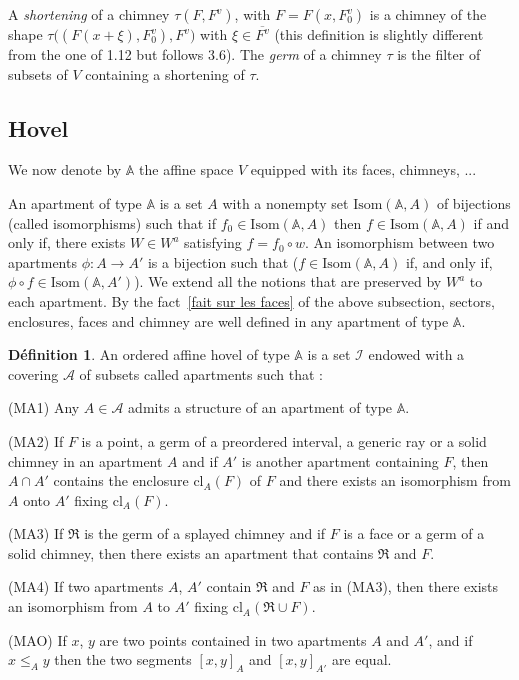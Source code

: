 \documentclass[12pt]{article}
\theoremstyle{plain}
\theoremstyle{definition}
\newtheorem{defn}[thm]{Définition}
\newcommand{\A}{\mathbb{A}}
\begin{document}
A \textit{shortening} of a chimney $\tau(F,F^v)$, with $F=F(x,F_0^v)$ is a chimney of the shape $\tau \big((F(x+\xi),F_0^v),F^v\big)$ with $\xi\in \overline{F^v}$ (this definition is slightly different from the one of \cite{rousseau2011masures} 1.12 but follows \cite{rousseau2012almost} 3.6). The \textit{germ} of a chimney $\tau$ is the filter of subsets of $V$ containing a shortening of $\tau$.




\subsection{Hovel}
We now denote by $\A$ the affine space $V$ equipped with its faces, chimneys, ...


An apartment of type $\A$ is a set $A$ with a nonempty set $\mathrm{Isom}(\A,A)$ of bijections (called isomorphisms) such that if $f_0\in \mathrm{Isom}(\A,A)$ then $f\in \mathrm{Isom}(\A,A)$ if and only if, there exists $W\in W^a$ satisfying $f=f_0\circ w$. An isomorphism between two apartments $\phi:A\rightarrow A'$ is a bijection such that ($f\in \mathrm{Isom}(\mathbb{A},A)$ if, and only if, $\phi \circ f\in \mathrm{Isom}(\A,A')$). We extend all the notions that are preserved by $W^a$ to each apartment. By the fact~\ref{fait sur les faces} of the above subsection, sectors, enclosures, faces and chimney are well defined in any apartment of type $\A$.

\begin{defn}
An ordered affine hovel of type $\A$ is a set $\mathcal{I}$ endowed with a covering $\mathcal{A}$ of subsets called apartments such that : 

(MA1) Any $A\in \mathcal{A}$ admits a structure of an apartment of type $\A$.

(MA2) If $F$ is a point, a germ of a preordered interval, a generic ray or a solid chimney in an apartment $A$ and if $A'$ is another apartment containing $F$, then $A\cap A'$ contains the enclosure $\mathrm{cl}_A(F)$ of $F$ and there exists an isomorphism from $A$ onto $A'$ fixing $\mathrm{cl}_A(F)$.

(MA3) If $\mathfrak{R}$ is the germ of a splayed chimney and if $F$ is a face or a germ of a solid chimney, then there exists an apartment that contains $\mathfrak{R}$ and $F$.

(MA4) If two apartments $A$, $A'$ contain $\mathfrak{R}$ and $F$ as in (MA3), then there exists an isomorphism from $A$ to $A'$ fixing $\mathrm{cl}_A(\mathfrak{R}\cup F)$.

(MAO) If $x$, $y$ are two points contained in two apartments $A$ and $A'$, and if $x\leq_{A} y$ then the two segments $[x,y]_A$ and $[x,y]_{A'}$ are equal.
\end{defn}
\end{document}
